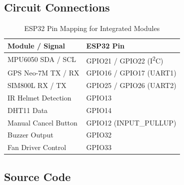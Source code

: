 \documentclass[10pt,a4paper]{article}
\begin{document}
\subsection{Circuit Connections}

\begin{table}[H]
\centering
\renewcommand{\arraystretch}{1.4}
\begin{tabular}{|l|l|}
  \hline
  \rowcolor{accentblue!12}
  \textbf{Module / Signal} & \textbf{ESP32 Pin} \\
  \hline
  MPU6050 SDA / SCL & GPIO21 / GPIO22 (I\textsuperscript{2}C) \\
  GPS Neo-7M TX / RX & GPIO16 / GPIO17 (UART1) \\
  SIM800L RX / TX & GPIO25 / GPIO26 (UART2) \\
  IR Helmet Detection & GPIO13 \\
  DHT11 Data & GPIO14 \\
  Manual Cancel Button & GPIO12 (INPUT\_PULLUP) \\
  Buzzer Output & GPIO32 \\
  Fan Driver Control & GPIO33 \\
  \hline
\end{tabular}
\caption{ESP32 Pin Mapping for Integrated Modules}
\end{table}

\subsection{Source Code}
\end{document}
